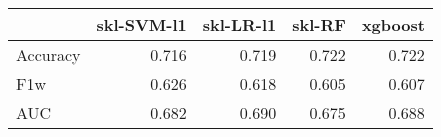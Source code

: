 \begin{tabular}{lrrrr}
\toprule
{} &  skl-SVM-l1 &  skl-LR-l1 &  skl-RF &  xgboost \\
\midrule
Accuracy &       0.716 &      0.719 &   0.722 &    0.722 \\
F1w      &       0.626 &      0.618 &   0.605 &    0.607 \\
AUC      &       0.682 &      0.690 &   0.675 &    0.688 \\
\bottomrule
\end{tabular}
